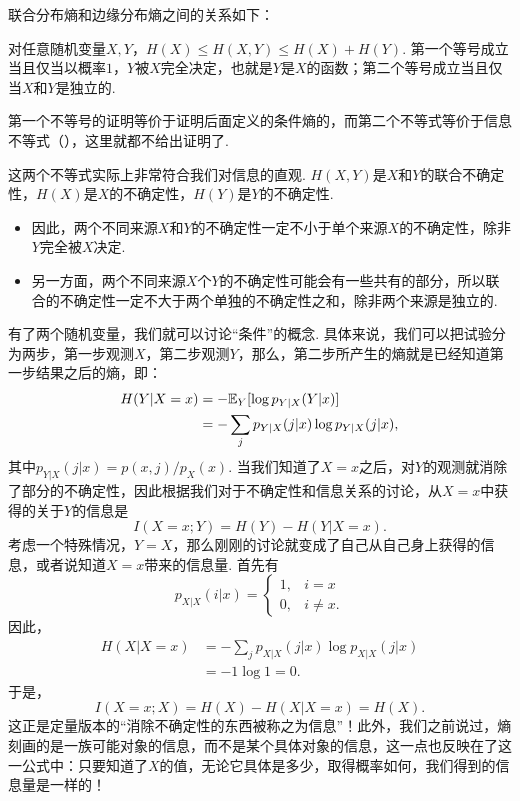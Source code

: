 联合分布熵和边缘分布熵之间的关系如下：

\begin{proposition}\label{proposition:entropy-joint-marginal}
    对任意随机变量$X,Y$，$H(X)\leq H(X,Y)\leq H(X)+H(Y)$. 第一个等号成立当且仅当以概率$1$，$Y$被$X$完全决定，也就是$Y$是$X$的函数；第二个等号成立当且仅当$X$和$Y$是独立的.
\end{proposition}

第一个不等号的证明等价于证明后面定义的条件熵的，而第二个不等式等价于信息不等式（），这里就都不给出证明了.

这两个不等式实际上非常符合我们对信息的直观. $H(X,Y)$是$X$和$Y$的联合不确定性，$H(X)$是$X$的不确定性，$H(Y)$是$Y$的不确定性. 
\begin{itemize}
    \item 因此，两个不同来源$X$和$Y$的不确定性一定不小于单个来源$X$的不确定性，除非$Y$完全被$X$决定. 
    \item 另一方面，两个不同来源$X$个$Y$的不确定性可能会有一些共有的部分，所以联合的不确定性一定不大于两个单独的不确定性之和，除非两个来源是独立的.
\end{itemize}

有了两个随机变量，我们就可以讨论“条件”的概念. 具体来说，我们可以把试验分为两步，第一步观测$X$，第二步观测$Y$，那么，第二步所产生的熵就是已经知道第一步结果之后的熵，即：
\begin{align*}
    H(Y| X=x)&=-\mathbb{E}_Y[\log p_{Y| X}(Y|x)]\\
    &=-\sum_{j}p_{Y|X}(j|x)\log p_{Y|X}(j|x),
\end{align*}
其中$p_{Y|X}(j|x)=p(x,j)/p_X(x)$. 当我们知道了$X=x$之后，对$Y$的观测就消除了部分的不确定性，因此根据我们对于不确定性和信息关系的讨论，从$X=x$中获得的关于$Y$的信息是
\[I(X=x;Y)=H(Y)-H(Y|X=x).\]
考虑一个特殊情况，$Y=X$，那么刚刚的讨论就变成了自己从自己身上获得的信息，或者说知道$X=x$带来的信息量. 首先有
\[p_{X|X}(i|x)=\begin{cases}
    1,&i=x\\
    0,&i\ne x.
\end{cases}\]
因此，
\begin{align*}
    H(X| X=x)&=-\sum_{j}p_{X|X}(j|x)\log p_{X|X}(j|x)\\
    &=-1\log 1=0.
\end{align*}
于是，
\[I(X=x;X)=H(X)-H(X|X=x)=H(X).\]
这正是定量版本的“消除不确定性的东西被称之为信息”！此外，我们之前说过，熵刻画的是一族可能对象的信息，而不是某个具体对象的信息，这一点也反映在了这一公式中：只要知道了$X$的值，无论它具体是多少，取得概率如何，我们得到的信息量是一样的！

